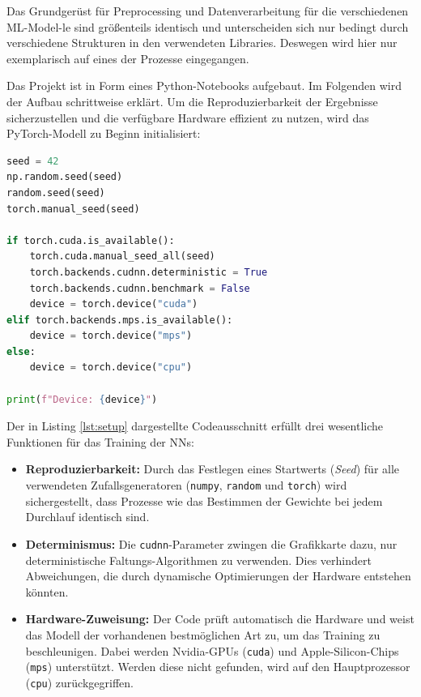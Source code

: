Das Grundgerüst für Preprocessing und Datenverarbeitung für die verschiedenen ML-Model-le sind größenteils identisch und unterscheiden sich nur bedingt durch verschiedene Strukturen in den verwendeten Libraries. Deswegen wird hier nur exemplarisch auf eines der Prozesse eingegangen.

Das Projekt ist in Form eines Python-Notebooks aufgebaut. Im Folgenden wird der Aufbau schrittweise erklärt. Um die Reproduzierbarkeit der Ergebnisse sicherzustellen und die verfügbare Hardware effizient zu nutzen, wird das PyTorch-Modell zu Beginn initialisiert:

\begin{lstlisting}[language=Python, caption={Initialisierung der Zufallsgeneratoren und Hardware-Zuweisung für NNs.}, label={lst:setup}]
seed = 42
np.random.seed(seed)
random.seed(seed)
torch.manual_seed(seed)

if torch.cuda.is_available():
    torch.cuda.manual_seed_all(seed)
    torch.backends.cudnn.deterministic = True
    torch.backends.cudnn.benchmark = False
    device = torch.device("cuda")
elif torch.backends.mps.is_available():
    device = torch.device("mps")
else:
    device = torch.device("cpu")

print(f"Device: {device}")
\end{lstlisting}

Der in Listing \ref{lst:setup} dargestellte Codeausschnitt erfüllt drei wesentliche Funktionen für das Training der NNs:
\begin{itemize}
    \item \textbf{Reproduzierbarkeit:} Durch das Festlegen eines Startwerts (\textit{Seed}) für alle verwendeten Zufallsgeneratoren (\texttt{numpy}, \texttt{random} und \texttt{torch}) wird sichergestellt, dass Prozesse wie das Bestimmen der Gewichte bei jedem Durchlauf identisch sind.
    \item \textbf{Determinismus:} Die \texttt{cudnn}-Parameter zwingen die Grafikkarte dazu, nur deterministische Faltungs-Algorithmen zu verwenden. Dies verhindert Abweichungen, die durch dynamische Optimierungen der Hardware entstehen könnten.
    \item \textbf{Hardware-Zuweisung:} Der Code prüft automatisch die Hardware und weist das Modell der vorhandenen bestmöglichen Art zu, um das Training zu beschleunigen. Dabei werden Nvidia-GPUs (\texttt{cuda}) und Apple-Silicon-Chips (\texttt{mps}) unterstützt. Werden diese nicht gefunden, wird auf den Hauptprozessor (\texttt{cpu}) zurückgegriffen.
\end{itemize}


